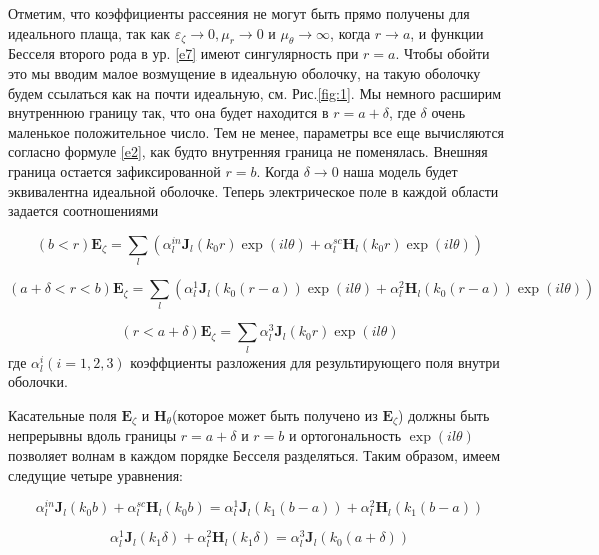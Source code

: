 \documentclass[a4paper, 12pt]{article}
\begin{document}
Отметим, что коэффициенты рассеяния не могут быть прямо получены для идеального плаща, так как $\varepsilon_\zeta \to 0,
\mu_r \to 0$ и $\mu_\theta \to \infty$, когда $r \to a$, и функции Бесселя второго рода в ур. \eqref{e7} имеют 
сингулярность при $r = a$. Чтобы обойти это мы вводим малое возмущение в идеальную оболочку, на такую оболочку будем
ссылаться как на почти идеальную, см. Рис.\ref{fig:1}.  Мы немного расширим внутреннюю границу так, что она будет
находится в $r = a + \delta$, где $\delta$ очень маленькое положительное число. Тем не менее, параметры все еще
вычисляются согласно формуле \eqref{e2}, как будто внутренняя граница не поменялась. Внешняя граница остается
зафиксированной $r = b$. Когда $\delta \to 0$ наша модель будет эквивалентна идеальной оболочке. Теперь электрическое
поле в каждой области задается соотношениями

\begin{equation*}
	(b<r)\mathbf{E}_\zeta = \sum\limits_l (\alpha_l^{in} \mathbf{J}_l(k_0 r)\exp(il\theta) +
								\alpha_l^{sc} \mathbf{H}_l(k_0 r)\exp(il\theta))
\end{equation*}
 
\begin{equation}\label{e10}
	(a+\delta<r<b)\mathbf{E}_\zeta = \sum\limits_l (\alpha_l^{1} \mathbf{J}_l(k_0 (r-a))\exp(il\theta) +
								\alpha_l^{2} \mathbf{H}_l(k_0 (r-a))\exp(il\theta))
\end{equation}

\begin{equation*}
	(r<a+\delta)\mathbf{E}_\zeta = \sum\limits_l \alpha_l^{3} \mathbf{J}_l(k_0 r)\exp(il\theta)
\end{equation*}
где $\alpha_l^i(i=1,2,3)$ коэффциенты разложения для результирующего поля внутри оболочки.

Касательные поля $\mathbf{E}_\zeta$ и $\mathbf{H}_\theta$(которое может быть получено из $\mathbf{E}_\zeta$)
должны быть непрерывны вдоль границы $r=a+\delta$ и $r=b$ и ортогональность $\exp(il\theta)$ позволяет волнам
в каждом порядке Бесселя разделяться. Таким образом, имеем следущие четыре уравнения:

\begin{equation}\tag{11a}\label{e11a}
	\alpha_l^{in} \mathbf{J}_l(k_0 b) + \alpha_l^{sc} \mathbf{H}_l(k_0 b) = 
	\alpha_l^1 \mathbf{J}_l(k_1(b-a)) + \alpha_l^2 \mathbf{H}_l(k_1(b-a)) 	
\end{equation}

\begin{equation}\tag{11b}\label{e11b}
	\alpha_l^1 \mathbf{J}_l(k_1 \delta) + \alpha_l^2 \mathbf{H}_l(k_1 \delta) = \alpha_l^3 \mathbf{J}_l(k_0(a+\delta)) 
\end{equation}
\end{document}
